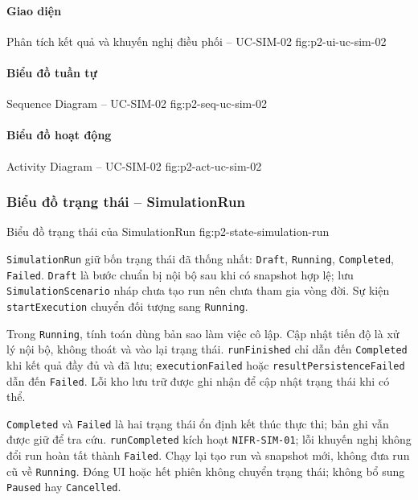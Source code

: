 \par\medskip
\noindent\begin{minipage}{\linewidth}
\paragraph{Giao diện}
  {Phân tích kết quả và khuyến nghị điều phối -- UC-SIM-02}
  {fig:p2-ui-uc-sim-02}
  {}
\end{minipage}\par

\clearpage
\paragraph{Biểu đồ tuần tự}

  {Sequence Diagram -- UC-SIM-02}
  {fig:p2-seq-uc-sim-02}

\clearpage
\paragraph{Biểu đồ hoạt động}

  {Activity Diagram -- UC-SIM-02}
  {fig:p2-act-uc-sim-02}

\clearpage

\subsubsection{Biểu đồ trạng thái -- SimulationRun}
  {Biểu đồ trạng thái của SimulationRun}
  {fig:p2-state-simulation-run}{}

\texttt{SimulationRun} giữ bốn trạng thái đã thống nhất: \texttt{Draft}, \texttt{Running}, \texttt{Completed}, \texttt{Failed}. \texttt{Draft} là bước chuẩn bị nội bộ sau khi có snapshot hợp lệ; lưu \texttt{SimulationScenario} nháp chưa tạo run nên chưa tham gia vòng đời. Sự kiện \texttt{startExecution} chuyển đối tượng sang \texttt{Running}.

Trong \texttt{Running}, tính toán dùng bản sao làm việc cô lập. Cập nhật tiến độ là xử lý nội bộ, không thoát và vào lại trạng thái. \texttt{runFinished} chỉ dẫn đến \texttt{Completed} khi kết quả đầy đủ và đã lưu; \texttt{executionFailed} hoặc \texttt{resultPersistenceFailed} dẫn đến \texttt{Failed}. Lỗi kho lưu trữ được ghi nhận để cập nhật trạng thái khi có thể.

\texttt{Completed} và \texttt{Failed} là hai trạng thái ổn định kết thúc thực thi; bản ghi vẫn được giữ để tra cứu. \texttt{runCompleted} kích hoạt \texttt{NIFR-SIM-01}; lỗi khuyến nghị không đổi run hoàn tất thành \texttt{Failed}. Chạy lại tạo run và snapshot mới, không đưa run cũ về \texttt{Running}. Đóng UI hoặc hết phiên không chuyển trạng thái; không bổ sung \texttt{Paused} hay \texttt{Cancelled}.

\clearpage
